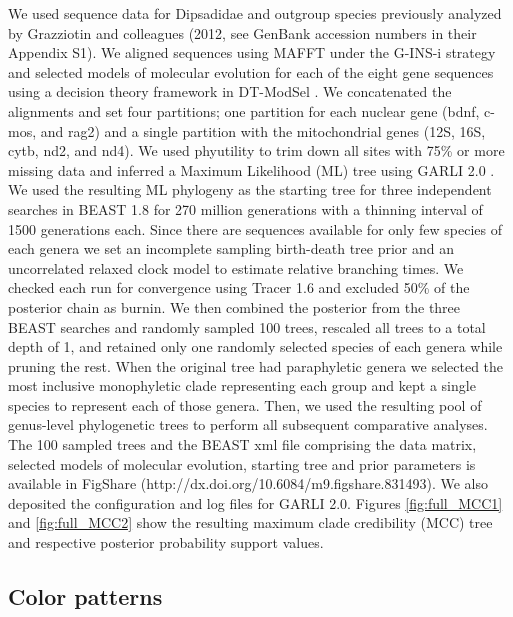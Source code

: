 We used sequence data for Dipsadidae and outgroup species previously analyzed by Grazziotin and colleagues (2012, see GenBank accession numbers in their Appendix S1). We aligned sequences using MAFFT \citep{katoh_mafft_2005} under the G-INS-i strategy and selected models of molecular evolution for each of the eight gene sequences using a decision theory framework in DT-ModSel \citep{minin_2003}. We concatenated the alignments and set four partitions; one partition for each nuclear gene (bdnf, c-mos, and rag2) and a single partition with the mitochondrial genes (12S, 16S, cytb, nd2, and nd4). We used phyutility \citep{smith_2008} to trim down all sites with 75\% or more missing data and inferred a Maximum Likelihood (ML) tree using GARLI 2.0 \citep{zwickl_2011}. We used the resulting ML phylogeny as the starting tree for three independent searches in BEAST 1.8 \citep{drummond_bayesian_2012} for 270 million generations with a thinning interval of 1500 generations each. Since there are sequences available for only few species of each genera we set an incomplete sampling birth-death tree prior \citep{stadler_2009} and an uncorrelated relaxed clock model to estimate relative branching times. We checked each run for convergence using Tracer 1.6 \citep{drummond_bayesian_2012} and excluded 50\% of the posterior chain as burnin. We then combined the posterior from the three BEAST searches and randomly sampled 100 trees, rescaled all trees to a total depth of 1, and retained only one randomly selected species of each genera while pruning the rest. When the original tree had paraphyletic genera we selected the most inclusive monophyletic clade representing each group and kept a single species to represent each of those genera. Then, we used the resulting pool of genus-level phylogenetic trees to perform all subsequent comparative analyses. The 100 sampled trees and the BEAST xml file comprising the data matrix, selected models of molecular evolution, starting tree and prior parameters is available in FigShare (http://dx.doi.org/10.6084/m9.figshare.831493). We also deposited the configuration and log files for GARLI 2.0. Figures \ref{fig:full_MCC1} and \ref{fig:full_MCC2} show the resulting maximum clade credibility (MCC) tree and respective posterior probability support values.

\subsection{Color patterns}

